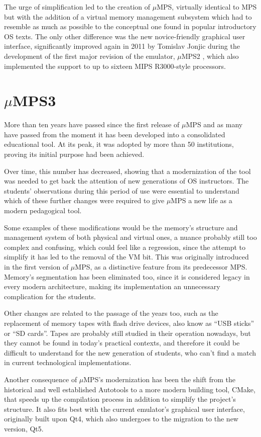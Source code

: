 \documentclass[12pt,a4paper,openright,twoside]{report}
\begin{document}
The urge of simplification led to the creation of $\mu$MPS, virtually identical to MPS but with the addition of a virtual memory management subsystem which had to resemble as much as possible to the conceptual one found in popular introductory OS texts.
The only other difference was the new novice-friendly graphical user interface, significantly improved again in 2011 by Tomislav Jonjic during the development of the first major revision of the emulator, $\mu$MPS2 \cite{umps2}, which also implemented the support to up to sixteen MIPS R3000-style processors.

\section{$\mu$MPS3}
More than ten years have passed since the first release of $\mu$MPS and as many have passed from the moment it has been developed into a consolidated educational tool.
At its peak, it was adopted by more than 50 institutions, proving its initial purpose had been achieved.

Over time, this number has decreased, showing that a modernization of the tool was needed to get back the attention of new generations of OS instructors.
The students' observations during this period of use were essential to understand which of these further changes were required to give $\mu$MPS a new life as a modern pedagogical tool.

Some examples of these modifications would be the memory's structure and management system of both physical and virtual ones, a nuance probably still too complex and confusing, which could feel like a regression, since the attempt to simplify it has led to the removal of the VM bit.
This was originally introduced in the first version of $\mu$MPS, as a distinctive feature from its predecessor MPS.
Memory's segmentation has been eliminated too, since it is considered legacy in every modern architecture, making its implementation an unnecessary complication for the students.

Other changes are related to the passage of the years too, such as the replacement of memory tapes with flash drive devices, also know as ``USB sticks'' or ``SD cards''.
Tapes are probably still studied in their operation nowadays, but they cannot be found in today's practical contexts, and therefore it could be difficult to understand for the new generation of students, who can't find a match in current technological implementations.

Another consequence of $\mu$MPS's modernization has been the shift from the historical and well established Autotools to a more modern building tool, CMake, that speeds up the compilation process in addition to simplify the project's structure.
It also fits best with the current emulator's graphical user interface, originally built upon Qt4, which also undergoes to the migration to the new version, Qt5.
\end{document}
